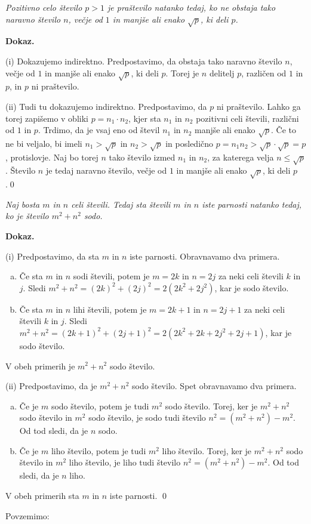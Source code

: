 \documentclass[11pt,paper=b5,DIV=13,headinclude,footinclude]{scrbook}
\newcounter{example}
\begin{document}
\begin{example*}

\emph{ Pozitivno celo število $p>1$ je praštevilo natanko tedaj, ko ne obstaja tako naravno število
$n$, večje od $1$ in manjše ali enako $\sqrt{p}$, ki deli $p$.}

\medskip \noindent\textbf{ Dokaz.}

(i) Dokazujemo indirektno. Predpostavimo, da obstaja tako naravno število
$n$, večje od $1$ in manjše ali enako $\sqrt{p}$, ki deli $p$. Torej je $n$ delitelj $p$, različen od
$1$ in $p$, in $p$ ni praštevilo.

(ii) Tudi tu dokazujemo indirektno. Predpostavimo, da $p$ ni praštevilo. Lahko ga torej zapišemo v obliki
$p = n_1\cdot n_2$, kjer sta $n_1$ in $n_2$ pozitivni celi števili, različni od $1$ in $p$.
Trdimo, da je vsaj eno od  števil $n_1$ in $n_2$ manjše ali enako $\sqrt{p}$.
Če to ne bi veljalo, bi imeli $n_1>\sqrt{p}$ in $n_2>\sqrt{p}$ in posledično
$p = n_1n_2>\sqrt{p}\cdot\sqrt{p} = p$, protislovje.
Naj bo torej $n$ tako število izmed $n_1$ in $n_2$, za katerega velja  $n\le \sqrt{p}$.
Število $n$ je tedaj naravno število, večje od $1$ in manjše ali enako $\sqrt{p}$, ki deli $p$.\qed
\end{example*}
\medskip
\begin{example*}

\emph{ Naj bosta $m$ in $n$ celi števili. Tedaj sta števili $m$ in $n$ iste parnosti natanko tedaj, ko je število $m^2 + n^2$ sodo.}

\medskip \noindent\textbf{ Dokaz.}

(i) Predpostavimo, da sta $m$ in $n$ iste parnosti. Obravnavamo dva primera.
\begin{enumerate}[(a)]
  \item Če sta $m$ in $n$ sodi števili, potem je $m = 2k$ in $n = 2j$ za neki celi števili $k$ in $j$.
  Sledi $m^2+n^2 = (2k)^2+(2j)^2 = 2(2k^2+2j^2)$, kar je sodo število.
  \item Če sta $m$ in $n$ lihi števili, potem je $m = 2k+1$ in $n = 2j+1$ za neki celi števili $k$ in $j$.
  Sledi $m^2+n^2 = (2k+1)^2+(2j+1)^2 = 2(2k^2+2k+2j^2+2j+1)$, kar je sodo število.
\end{enumerate}
V obeh primerih je $m^2+n^2$ sodo število.

(ii) Predpostavimo, da je $m^2+n^2$ sodo število. Spet obravnavamo dva primera.
\begin{enumerate}[(a)]
  \item Če je $m$ sodo število, potem je tudi $m^2$ sodo število. Torej, ker je $m^2+n^2$ sodo število in $m^2$ sodo število, je sodo tudi število
  $n^2 = (m^2+n^2)-m^2$. Od tod sledi, da je $n$ sodo.
  \item Če je $m$ liho število, potem je tudi $m^2$ liho število.
  Torej, ker je $m^2+n^2$ sodo število in $m^2$ liho število, je liho tudi število
  $n^2 = (m^2+n^2)-m^2$. Od tod sledi, da je $n$ liho.
  \end{enumerate}
V obeh primerih sta $m$ in $n$ iste parnosti.
\qed
\end{example*}
Povzemimo:
\end{document}
